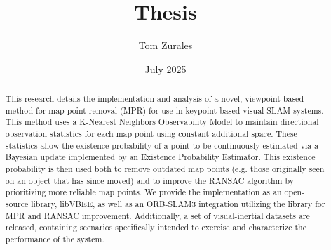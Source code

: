 \documentclass[12pt]{article}
\title{Thesis}
\author{Tom Zurales}
\date{July 2025}
\begin{document}
\doublespace

\maketitle

\newpage

\begin{abstract}
    This research details the implementation and analysis of a novel, viewpoint-based method for map point removal (MPR) for use in keypoint-based visual SLAM systems. This method uses a K-Nearest Neighbors Observability Model to maintain directional observation statistics for each map point using constant additional space. These statistics allow the existence probability of a point to be continuously estimated via a Bayesian update implemented by an Existence Probability Estimator. This existence probability is then used both to remove outdated map points (e.g. those originally seen on an object that has since moved) and to improve the RANSAC algorithm by prioritizing more reliable map points. We provide the implementation as an open-source library, libVBEE, as well as an ORB-SLAM3 integration utilizing the library for MPR and RANSAC improvement. Additionally, a set of visual-inertial datasets are released, containing scenarios specifically intended to exercise and characterize the performance of the system. %
\end{abstract}


\newpage

\tableofcontents

\newpage

\listoffigures
\listofalgorithms















\printbibliography


\end{document}
